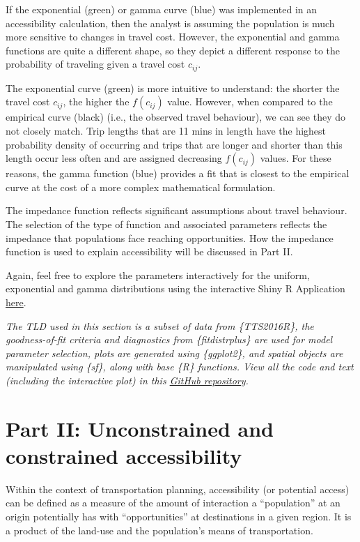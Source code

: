\documentclass[12pt, oneside]{report}
\begin{document}
If the exponential (green) or gamma curve (blue) was implemented in an
accessibility calculation, then the analyst is assuming the population
is much more sensitive to changes in travel cost. However, the
exponential and gamma functions are quite a different shape, so they
depict a different response to the probability of traveling given a
travel cost \(c_{ij}\).

The exponential curve (green) is more intuitive to understand: the
shorter the travel cost \(c_{ij}\), the higher the \(f(c_{ij})\) value.
However, when compared to the empirical curve (black) (i.e., the
observed travel behaviour), we can see they do not closely match. Trip
lengths that are 11 mins in length have the highest probability density
of occurring and trips that are longer and shorter than this length
occur less often and are assigned decreasing \(f(c_{ij})\) values. For
these reasons, the gamma function (blue) provides a fit that is closest
to the empirical curve at the cost of a more complex mathematical
formulation.

The impedance function reflects significant assumptions about travel
behaviour. The selection of the type of function and associated
parameters reflects the impedance that populations face reaching
opportunities. How the impedance function is used to explain
accessibility will be discussed in Part II.

Again, feel free to explore the parameters interactively for the
uniform, exponential and gamma distributions using the interactive Shiny
R Application
\href{https://soukhova.shinyapps.io/Impedance-explained-shiny-app/}{here}.

\emph{The TLD used in this section is a subset of data from
\{TTS2016R\}, the goodness-of-fit criteria and diagnostics from
\{fitdistrplus\} are used for model parameter selection, plots are
generated using \{ggplot2\}, and spatial objects are manipulated using
\{sf\}, along with base \{R\} functions. View all the code and text
(including the interactive plot) in this
\href{https://github.com/soukhova/MJ-Accessibility-Blogs}{GitHub
repository}.}

\newpage

\hypertarget{sec-partII}{%
\section{Part II: Unconstrained and constrained
accessibility}\label{sec-partII}}

Within the context of transportation planning, accessibility (or
potential access) can be defined as a measure of the amount of
interaction a ``population'' at an origin potentially has with
``opportunities'' at destinations in a given region. It is a product of
the land-use and the population's means of transportation.
\end{document}
